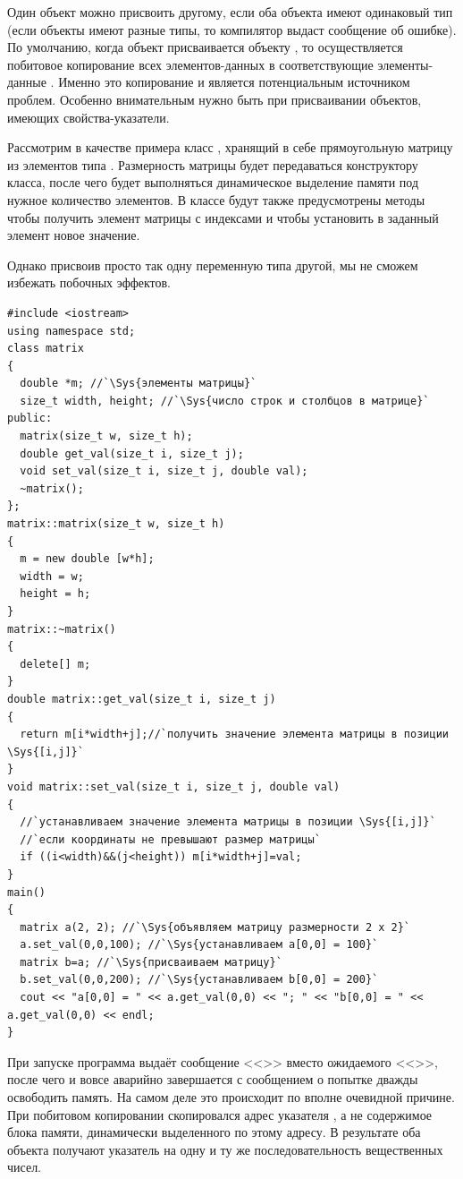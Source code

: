 Один объект можно присвоить другому, если оба объекта имеют одинаковый тип (если объекты имеют разные типы, то
компилятор выдаст сообщение об ошибке). По умолчанию, когда объект  присваивается объекту
, то осуществляется побитовое копирование всех элементов-данных  в
соответствующие элементы-данные . Именно это копирование и является потенциальным источником
проблем. Особенно внимательным нужно быть при присваивании объектов, имеющих
свойства-указатели.

Рассмотрим в качестве примера класс , хранящий в
себе прямоугольную матрицу из элементов типа . Размерность матрицы
будет передаваться конструктору класса, после чего будет выполняться динамическое выделение памяти под нужное
количество элементов. В классе будут также предусмотрены методы 
чтобы получить элемент матрицы с индексами  и
 чтобы установить в заданный элемент новое значение. 

Однако присвоив просто так одну переменную типа 
другой, мы не сможем избежать побочных эффектов.
\begin{lstlisting}
#include <iostream>
using namespace std;
class matrix 
{
  double *m; //`\Sys{элементы матрицы}`
  size_t width, height; //`\Sys{число строк и столбцов в матрице}`
public:
  matrix(size_t w, size_t h);
  double get_val(size_t i, size_t j); 
  void set_val(size_t i, size_t j, double val);
  ~matrix();
};
matrix::matrix(size_t w, size_t h) 
{ 
  m = new double [w*h]; 
  width = w;
  height = h;
}
matrix::~matrix() 
{ 
  delete[] m; 
}
double matrix::get_val(size_t i, size_t j) 
{
  return m[i*width+j];//`получить значение элемента матрицы в позиции \Sys{[i,j]}`
}
void matrix::set_val(size_t i, size_t j, double val) 
{
  //`устанавливаем значение элемента матрицы в позиции \Sys{[i,j]}`
  //`если координаты не превышают размер матрицы`
  if ((i<width)&&(j<height)) m[i*width+j]=val;
}	
main() 
{
  matrix a(2, 2); //`\Sys{объявляем матрицу размерности 2 х 2}`
  a.set_val(0,0,100); //`\Sys{устанавливаем a[0,0] = 100}`
  matrix b=a; //`\Sys{присваиваем матрицу}`
  b.set_val(0,0,200); //`\Sys{устанавливаем b[0,0] = 200}`
  cout << "a[0,0] = " << a.get_val(0,0) << "; " << "b[0,0] = " << a.get_val(0,0) << endl;
}
\end{lstlisting}

При запуске программа выдаёт сообщение <<>>  вместо ожидаемого
<<>>, после чего и вовсе аварийно завершается с сообщением о попытке дважды освободить
память. На самом деле это происходит по вполне очевидной причине. При побитовом копировании скопировался адрес
указателя , а не содержимое блока памяти, динамически выделенного по этому адресу. В результате оба
объекта получают указатель на одну и ту же последовательность вещественных чисел.

